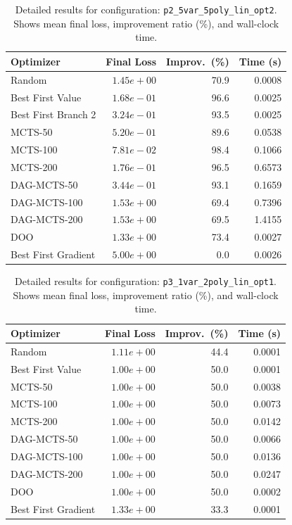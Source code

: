 \begin{table}[H]
\centering
\caption{Detailed results for configuration: \texttt{p2\_5var\_5poly\_lin\_opt2}. Shows mean final loss, improvement ratio (\%), and wall-clock time.}
\label{tab:abssum-detail-12}
\begin{tabular}{lrrr}
\toprule
Optimizer & Final Loss & Improv.~(\%) & Time (s) \\
\midrule
Random & $1.45e+00$ & 70.9 & 0.0008 \\
\hline
Best First Value & $1.68e-01$ & 96.6 & 0.0025 \\
\hline
Best First Branch 2 & $3.24e-01$ & 93.5 & 0.0025 \\
\hline
MCTS-50 & $5.20e-01$ & 89.6 & 0.0538 \\
\hline
MCTS-100 & \textbf{$7.81e-02$} & 98.4 & 0.1066 \\
\hline
MCTS-200 & $1.76e-01$ & 96.5 & 0.6573 \\
\hline
DAG-MCTS-50 & $3.44e-01$ & 93.1 & 0.1659 \\
\hline
DAG-MCTS-100 & $1.53e+00$ & 69.4 & 0.7396 \\
\hline
DAG-MCTS-200 & $1.53e+00$ & 69.5 & 1.4155 \\
\hline
DOO & $1.33e+00$ & 73.4 & 0.0027 \\
\hline
Best First Gradient & $5.00e+00$ & 0.0 & 0.0026 \\
\bottomrule
\end{tabular}
\end{table}

\begin{table}[H]
\centering
\caption{Detailed results for configuration: \texttt{p3\_1var\_2poly\_lin\_opt1}. Shows mean final loss, improvement ratio (\%), and wall-clock time.}
\label{tab:abssum-detail-13}
\begin{tabular}{lrrr}
\toprule
Optimizer & Final Loss & Improv.~(\%) & Time (s) \\
\midrule
Random & $1.11e+00$ & 44.4 & 0.0001 \\
\hline
Best First Value & \textbf{$1.00e+00$} & 50.0 & 0.0001 \\
\hline
MCTS-50 & \textbf{$1.00e+00$} & 50.0 & 0.0038 \\
\hline
MCTS-100 & \textbf{$1.00e+00$} & 50.0 & 0.0073 \\
\hline
MCTS-200 & \textbf{$1.00e+00$} & 50.0 & 0.0142 \\
\hline
DAG-MCTS-50 & \textbf{$1.00e+00$} & 50.0 & 0.0066 \\
\hline
DAG-MCTS-100 & \textbf{$1.00e+00$} & 50.0 & 0.0136 \\
\hline
DAG-MCTS-200 & \textbf{$1.00e+00$} & 50.0 & 0.0247 \\
\hline
DOO & $1.00e+00$ & 50.0 & 0.0002 \\
\hline
Best First Gradient & $1.33e+00$ & 33.3 & 0.0001 \\
\bottomrule
\end{tabular}
\end{table}

